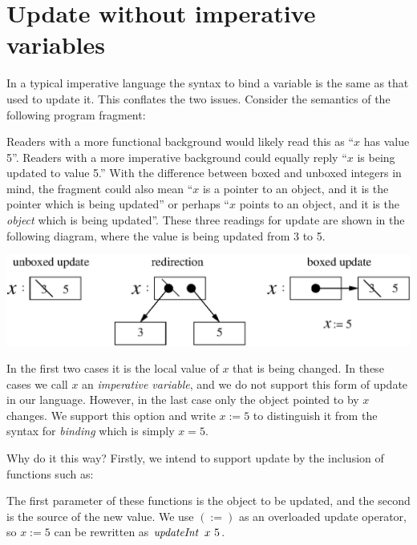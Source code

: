 
\clearpage{}
\section{Update without imperative variables}
\label{System:Update}
In a typical imperative language the syntax to bind a variable is the same as that used to update it. This conflates the two issues. Consider the semantics of the following program fragment:


Readers with a more functional background would likely read this as ``$x$ has value 5''. Readers with a more imperative background could equally reply ``$x$ is being updated to value 5.'' With the difference between boxed and unboxed integers in mind, the fragment could also mean ``$x$ is a pointer to an object, and it is the pointer which is being updated'' or perhaps ``$x$ points to an object, and it is the \emph{object} which is being updated''. These three readings for update are shown in the following diagram, where the value is being updated from 3 to 5.

\begin{center}
\includegraphics[scale=0.8]{2-System/fig/updateOperators}
\end{center}

In the first two cases it is the local value of $x$ that is being changed. In these cases we call $x$ an \emph{imperative variable}, and we do not support this form of update in our language. However, in the last case only the object pointed to by $x$ changes. We support this option and write $x := 5$ to distinguish it from the syntax for \emph{binding} which is simply $x = 5$.

Why do it this way? Firstly, we intend to support update by the inclusion of functions such as:

\code{
	$\iupdateInt$ 	& $::$ & $\iInt \to \iInt \to ()$ \\
	$\iupdateChar$ 	& $::$ & $\iChar \to \iChar \to ()$
}

The first parameter of these functions is the object to be updated, and the second is the source of the new value. We use $(:=)$ as an overloaded update operator, so $x := 5$ can be rewritten as $\iupdateInt \ x \ 5$.

